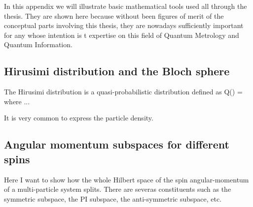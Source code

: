In this appendix we will illustrate basic mathematical tools used all through the thesis.
They are shown here because without been figures of merit of the conceptual parts involving this thesis, they are nowadays sufficiently important for any whose intention is t expertise on this field of Quantum Metrology and Quantum Information.

\subsection{Hirusimi distribution and the Bloch sphere}

The Hirusimi distribution is a quasi-probabilistic distribution defined as
\be
  Q(\alpha) = \braopket{\alpha}{\varrho}{\alpha}
\ee
where ...

It is very common to express the particle density.

\subsection{Angular momentum subspaces for different spins}
\label{app:angular-subspaces}

Here I want to show how the whole Hilbert space of the spin angular-momentum of a multi-particle system splits. There are severas constituents such as the symmetric subspace, the PI subspace, the anti-symmetric subspace, etc.
